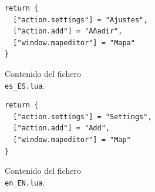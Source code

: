 \begin{itemize}
\begin{itemize}
\begin{figure}[t]
 \begin{minipage}{0.48\textwidth}
  \centering
  \begin{verbatim}
return {
  ["action.settings"] = "Ajustes",
  ["action.add"] = "Añadir",
  ["window.mapeditor"] = "Mapa"
}
  \end{verbatim}
  \caption{\small Contenido del fichero\\ \texttt{es\_ES.lua}.}
  \label{fig:luaes}
 \end{minipage}
 \hfill
 \begin{minipage}{0.48\textwidth}
  \centering
  \begin{verbatim}
return {
  ["action.settings"] = "Settings",
  ["action.add"] = "Add",
  ["window.mapeditor"] = "Map"
}
  \end{verbatim}
  \caption{\small Contenido del fichero\\ \texttt{en\_EN.lua}.}
  \label{fig:luaen}
 \end{minipage}
  \label{fig:lualang}
\end{figure}


\end{itemize}
\end{itemize}
